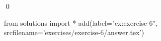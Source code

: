 
\begin{ex} 
  \label{ex:exercise-6}
  
  \qed
\end{ex} 
\begin{python0}
from solutions import *
add(label="ex:exercise-6",
    srcfilename='exercises/exercise-6/answer.tex') 
\end{python0}
